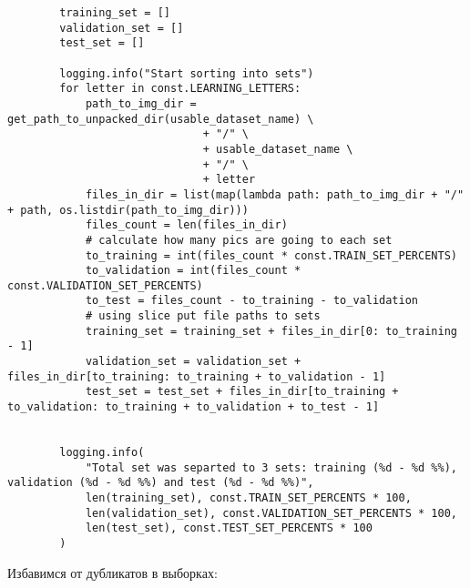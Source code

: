 \begin{lstlisting}
        training_set = []
        validation_set = []
        test_set = []

        logging.info("Start sorting into sets")
        for letter in const.LEARNING_LETTERS:
            path_to_img_dir = get_path_to_unpacked_dir(usable_dataset_name) \
                              + "/" \
                              + usable_dataset_name \
                              + "/" \
                              + letter
            files_in_dir = list(map(lambda path: path_to_img_dir + "/" + path, os.listdir(path_to_img_dir)))
            files_count = len(files_in_dir)
            # calculate how many pics are going to each set
            to_training = int(files_count * const.TRAIN_SET_PERCENTS)
            to_validation = int(files_count * const.VALIDATION_SET_PERCENTS)
            to_test = files_count - to_training - to_validation
            # using slice put file paths to sets
            training_set = training_set + files_in_dir[0: to_training - 1]
            validation_set = validation_set + files_in_dir[to_training: to_training + to_validation - 1]
            test_set = test_set + files_in_dir[to_training + to_validation: to_training + to_validation + to_test - 1]


        logging.info(
            "Total set was separted to 3 sets: training (%d - %d %%), validation (%d - %d %%) and test (%d - %d %%)",
            len(training_set), const.TRAIN_SET_PERCENTS * 100,
            len(validation_set), const.VALIDATION_SET_PERCENTS * 100,
            len(test_set), const.TEST_SET_PERCENTS * 100
        )
\end{lstlisting}

Избавимся от дубликатов в выборках:

